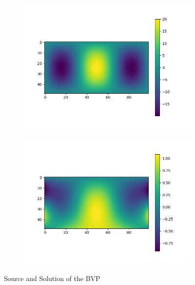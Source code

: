 \documentclass{article}
\begin{document}
\begin{figure}[H]
	\begin{subfigure}{.5\textwidth}
		\centering
		\includegraphics[width=.9\linewidth]{source.png}
	\end{subfigure}
	\begin{subfigure}{.5\textwidth}
		\centering
		\includegraphics[width=.9\linewidth]{Figure_1.png}
	\end{subfigure}
	\caption{Source and Solution of the BVP}
\end{figure}

\end{document}
